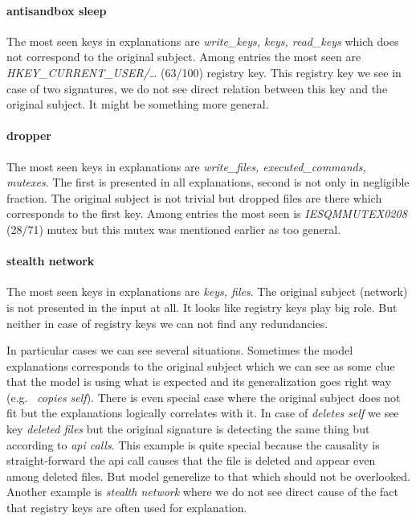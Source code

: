 \paragraph{antisandbox sleep}
The most seen keys in explanations are \emph{write_keys, keys, read_keys} which does not correspond to the original subject. Among entries the most seen are \emph{HKEY_CURRENT_USER/\dots} (63/100) registry key. This registry key we see in case of two signatures, we do not see direct relation between this key and the original subject. It might be something more general.

\paragraph{dropper}
The most seen keys in explanations are \emph{write_files, executed_commands, mutexes}. The first is presented in all explanations, second is not only in negligible fraction. The original subject is not trivial but dropped files are there which corresponds to the first key. Among entries the most seen is \emph{IESQMMUTEX0208} (28/71) mutex but this mutex was mentioned earlier as too general.

\paragraph{stealth network}
The most seen keys in explanations are \emph{keys, files}. The original subject (network) is not presented in the input at all. It looks like registry keys play big role. But neither in case of registry keys we can not find any redundancies.

In particular cases we can see several situations. Sometimes the model explanations corresponds to the original subject which we can see as some clue that the model is using what is expected and its generalization goes right way (e.g. \ \emph{copies self}). There is even special case where the original subject does not fit but the explanations logically correlates with it. In case of \emph{deletes self} we see key \emph{deleted files} but the original signature is detecting the same thing but according to \emph{api calls}. This example is quite special because the causality is straight-forward the api call causes that the file is deleted and appear even among deleted files. But model generelize to that which should not be overlooked. Another example is \emph{stealth network} where we do not see direct cause of the fact that registry keys are often used for explanation.

